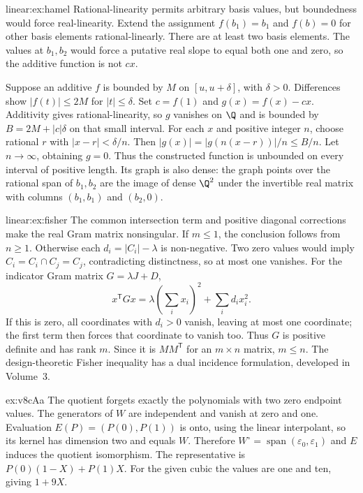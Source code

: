\begin{solution}{linear:ex:hamel}
\idea Rational-linearity permits arbitrary basis values, but boundedness would force real-linearity.
\writeup Extend the assignment $f(b_1)=b_1$ and $f(b)=0$ for other basis elements rational-linearly. There are at least two basis elements. The values at $b_1,b_2$ would force a putative real slope to equal both one and zero, so the additive function is not $cx$.

Suppose an additive $f$ is bounded by $M$ on $[u,u+\delta]$, with $\delta>0$. Differences show $|f(t)|\le2M$ for $|t|\le\delta$. Set $c=f(1)$ and $g(x)=f(x)-cx$. Additivity gives rational-linearity, so $g$ vanishes on $\Q$ and is bounded by $B=2M+|c|\delta$ on that small interval. For each $x$ and positive integer $n$, choose rational $r$ with $|x-r|<\delta/n$. Then $|g(x)|=|g(n(x-r))|/n\le B/n$. Let $n\to\infty$, obtaining $g=0$. Thus the constructed function is unbounded on every interval of positive length. Its graph is also dense: the graph points over the rational span of $b_1,b_2$ are the image of dense $\Q^2$ under the invertible real matrix with columns $(b_1,b_1)$ and $(b_2,0)$.
\end{solution}
\begin{solution}{linear:ex:fisher}
\idea The common intersection term and positive diagonal corrections make the real Gram matrix nonsingular.
\writeup If $m\le1$, the conclusion follows from $n\ge1$. Otherwise each $d_i=|C_i|-\lambda$ is non-negative. Two zero values would imply $C_i=C_i\cap C_j=C_j$, contradicting distinctness, so at most one vanishes. For the indicator Gram matrix $G=\lambda J+D$,
\[x^{\mathsf T}Gx=\lambda(\sum_ix_i)^2+\sum_id_ix_i^2.
\]
If this is zero, all coordinates with $d_i>0$ vanish, leaving at most one coordinate; the first term then forces that coordinate to vanish too. Thus $G$ is positive definite and has rank $m$. Since it is $MM^{\mathsf T}$ for an $m\times n$ matrix, $m\le n$. The design-theoretic Fisher inequality has a dual incidence formulation, developed in Volume~3.
\end{solution}
\begin{solution}{ex:v8cAa}
\idea The quotient forgets exactly the polynomials with two zero endpoint values.
\writeup The generators of $W$ are independent and vanish at zero and one. Evaluation $E(P)=(P(0),P(1))$ is onto, using the linear interpolant, so its kernel has dimension two and equals $W$. Therefore $W^\circ=\operatorname{span}(\varepsilon_0,\varepsilon_1)$ and $E$ induces the quotient isomorphism. The representative is $P(0)(1-X)+P(1)X$. For the given cubic the values are one and ten, giving $1+9X$.
\end{solution}
